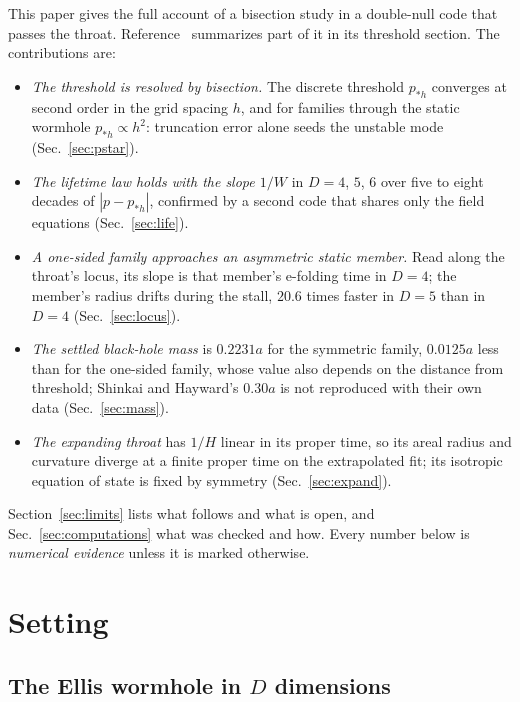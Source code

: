 \documentclass[11pt]{article}
\newcommand{\pst}{p_{*h}}
\begin{document}
This paper gives the full account of a bisection study in a double-null code that passes the throat. Reference~\cite{P3}
summarizes part of it in its threshold section. The contributions are:
\begin{itemize}
\item \emph{The threshold is resolved by bisection.} The discrete threshold $\pst$ converges at second order in the grid
spacing $h$, and for families through the static wormhole $\pst\propto h^2$: truncation error alone seeds the unstable
mode (Sec.~\ref{sec:pstar}).
\item \emph{The lifetime law holds with the slope $1/W$} in $D=4$, $5$, $6$ over five to eight decades of
$|p-\pst|$, confirmed by a second code that shares only the field equations (Sec.~\ref{sec:life}).
\item \emph{A one-sided family approaches an asymmetric static member.} Read along the throat's locus, its slope is that
member's e-folding time in $D=4$; the member's radius drifts during the stall, $20.6$ times faster in $D=5$ than in $D=4$
(Sec.~\ref{sec:locus}).
\item \emph{The settled black-hole mass} is $0.2231a$ for the symmetric family, $0.0125a$ less than for the one-sided
family, whose value also depends on the distance from threshold; Shinkai and Hayward's $0.30a$ is not reproduced with
their own data (Sec.~\ref{sec:mass}).
\item \emph{The expanding throat} has $1/H$ linear in its proper time, so its areal radius and curvature diverge at a
finite proper time on the extrapolated fit; its isotropic equation of state is fixed by symmetry
(Sec.~\ref{sec:expand}).
\end{itemize}
Section~\ref{sec:limits} lists what follows and what is open, and Sec.~\ref{sec:computations} what was checked and how.
Every number below is \emph{numerical evidence} unless it is marked otherwise.

\section{Setting}\label{sec:setting}

\subsection{The Ellis wormhole in \texorpdfstring{$D$}{D} dimensions}
\end{document}
